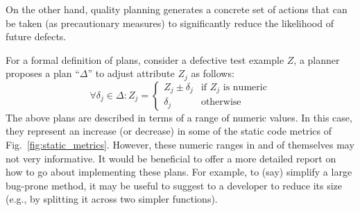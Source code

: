 \documentclass[smallextended]{svjour3}       %
\newcommand{\fig}[1]{Fig.~\ref{fig:#1}}
\begin{document}



On the other hand, quality planning generates a concrete set of actions that can be taken (as precautionary measures) to significantly reduce the likelihood of future defects.

For a formal definition of plans, consider a defective test example $Z$, a planner
proposes a plan ``$\Delta$'' to adjust attribute $Z_j$ as follows:
{\small\[
\forall \delta_j \in \Delta : Z_j = 
\begin{cases}
   Z_j \pm \delta_j& \text{if $Z_j$ is numeric}\\
  \delta_j       & \text{otherwise}
\end{cases}
\]}
The above plans are described in terms of a range of numeric values. In this case, they represent an increase (or decrease) in some of the static code metrics of \fig{static_metrics}. However, these numeric ranges in and of themselves may not very informative. It would be beneficial to offer a more detailed report on how to go about implementing these plans. For example, to (say) simplify a large bug-prone method, it may be useful to suggest to a developer to reduce its size (e.g., by splitting it across two simpler functions).
\end{document}
